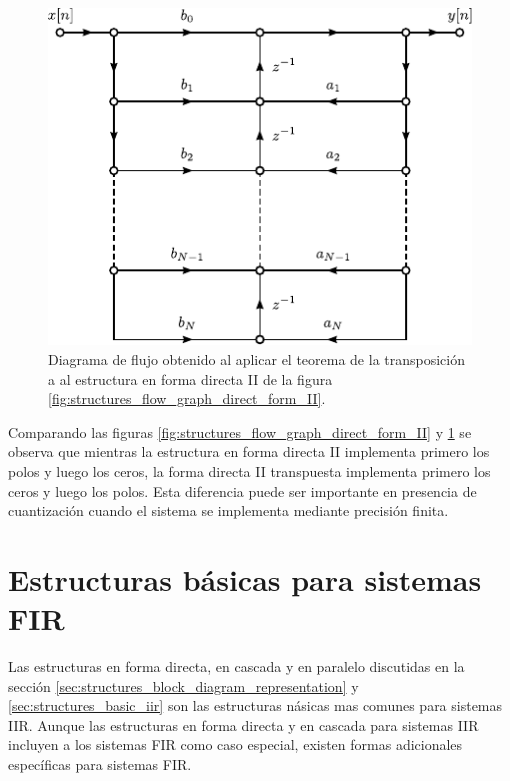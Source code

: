 \documentclass[a4paper]{report}
\begin{document}
\begin{figure}[!htb]
 \begin{minipage}[c]{0.64\textwidth}
  \includegraphics[width=\textwidth]{figuras/structures_flow_graph_transpose_direct_form_II.pdf}
 \end{minipage}\hfill
 \begin{minipage}[c]{0.26\textwidth}
  \caption{
   Diagrama de flujo obtenido al aplicar el teorema de la transposición a al estructura en forma directa II de la figura \ref{fig:structures_flow_graph_direct_form_II}.
   }\label{fig:structures_flow_graph_transpose_direct_form_II}
 \end{minipage}
\end{figure} 

Comparando las figuras \ref{fig:structures_flow_graph_direct_form_II} y \ref{fig:structures_flow_graph_transpose_direct_form_II} se observa que mientras la estructura en forma directa II implementa primero los polos y luego los ceros, la forma directa II transpuesta implementa primero los ceros y luego los polos. Esta diferencia puede ser importante en presencia de cuantización cuando el sistema se implementa  mediante precisión finita. 

\section{Estructuras básicas para sistemas FIR}

Las estructuras en forma directa, en cascada y en paralelo discutidas en la sección \ref{sec:structures_block_diagram_representation} y \ref{sec:structures_basic_iir} son las estructuras násicas mas comunes para sistemas IIR. Aunque las estructuras en forma directa y en cascada para sistemas IIR incluyen a los sistemas FIR como caso especial, existen formas adicionales específicas para sistemas FIR.
\end{document}
